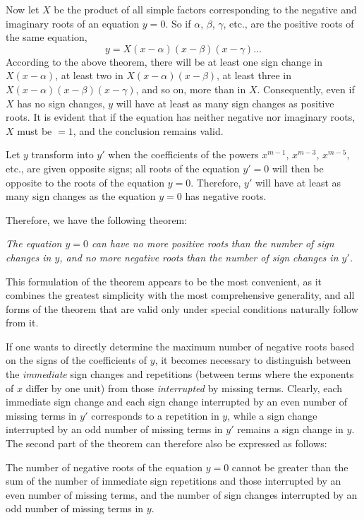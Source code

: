 \documentclass[14pt]{memoir}
\theoremstyle{plain}
\theoremstyle{remark}
\begin{document}
Now let \(X\) be the product of all simple factors corresponding to the negative and imaginary roots of an equation \(y=0\). So if \(\alpha\), \(\beta\), \(\gamma\), etc., are the positive roots of the same equation,
\[y = X(x-\alpha)(x-\beta)(x-\gamma)\dots\]
According to the above theorem, there will be at least one sign change in \(X(x-\alpha)\), at least two in \(X(x-\alpha)(x-\beta)\), at least three in \(X(x-\alpha)(x-\beta)(x-\gamma)\), and so on, more than in \(X\). Consequently, even if \(X\) has no sign changes, \(y\) will have at least as many sign changes as positive roots. It is evident that if the equation has neither negative nor imaginary roots, \(X\) must be \(=1\), and the conclusion remains valid.

Let \(y\) transform into \(y'\) when the coefficients of the powers \(x^{m-1}\), \(x^{m-3}\), \(x^{m-5}\), etc., are given opposite signs; all roots of the equation \(y'=0\) will then be opposite to the roots of the equation \(y=0\). Therefore, \(y'\) will have at least as many sign changes as the equation \(y=0\) has negative roots.

Therefore, we have the following theorem:

\textit{The equation \(y=0\) can have no more positive roots than the number of sign changes in \(y\), and no more negative roots than the number of sign changes in \(y'\).}

This formulation of the theorem appears to be the most convenient, as it combines the greatest simplicity with the most comprehensive generality, and all forms of the theorem that are valid only under special conditions naturally follow from it.

If one wants to directly determine the maximum number of negative roots based on the signs of the coefficients of \(y\), it becomes necessary to distinguish between the \textit{immediate} sign changes and repetitions (between terms where the exponents of \(x\) differ by one unit) from those \textit{interrupted} by missing terms. Clearly, each immediate sign change and each sign change interrupted by an even number of missing terms in \(y'\) corresponds to a repetition in \(y\), while a sign change interrupted by an odd number of missing terms in \(y'\) remains a sign change in \(y\). The second part of the theorem can therefore also be expressed as follows:

The number of negative roots of the equation \(y=0\) cannot be greater than the sum of the number of immediate sign repetitions and those interrupted by an even number of missing terms, and the number of sign changes interrupted by an odd number of missing terms in \(y\).
\end{document}
